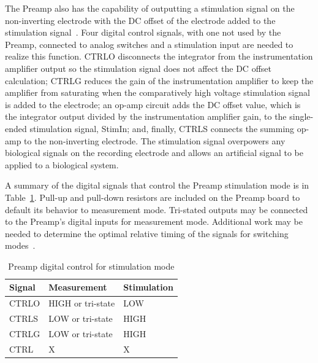 The Preamp also has the capability of outputting a stimulation signal on the non-inverting electrode with the DC offset of the electrode added to the stimulation signal~\cite{Jimbo2003,StahlMSEE}.  Four digital control signals, with one not used by the Preamp, connected to analog switches and a stimulation input are needed to realize this function.  CTRLO disconnects the integrator from the instrumentation amplifier output so the stimulation signal does not affect the DC offset calculation; CTRLG reduces the gain of the instrumentation amplifier to keep the amplifier from saturating when the comparatively high voltage stimulation signal is added to the electrode; an op-amp circuit adds the DC offset value, which is the integrator output divided by the instrumentation amplifier gain, to the single-ended stimulation signal, StimIn; and, finally, CTRLS connects the summing op-amp to the non-inverting electrode.  The stimulation signal overpowers any biological signals on the recording electrode and allows an artificial signal to be applied to a biological system.  

A summary of the digital signals that control the Preamp stimulation mode is in Table~\ref{tab:PreampStim}.  Pull-up and pull-down resistors are included on the Preamp board to default its behavior to measurement mode.  Tri-stated outputs may be connected to the Preamp's digital inputs for measurement mode.  Additional work may be needed to determine the optimal relative timing of the signals for switching modes~\cite{StahlMSEE}.

\renewcommand{\arraystretch}{1.3}
\begin{table}[hb]
\centering 
\begin{tabular}{|l|l|l|}
\hline
Signal	&	Measurement	& Stimulation\\
\hline
CTRLO	& HIGH or tri-state	& LOW\\
\hline
CTRLS	& LOW or tri-state	& HIGH\\
\hline
CTRLG	& LOW or tri-state	& HIGH\\
\hline
CTRL	& X	& X\\
\hline
\end{tabular}
\caption{Preamp digital control for stimulation mode\label{tab:PreampStim} }

\end{table}
\renewcommand{\arraystretch}{1.0}


